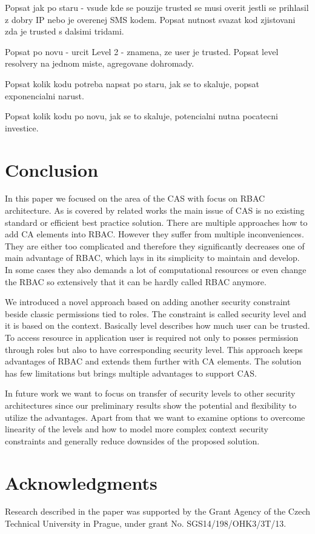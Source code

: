 \documentclass{sig-alternate}
\begin{document}
Popsat jak po staru - vsude kde se pouzije trusted se musi overit jestli se prihlasil z dobry IP nebo je overenej SMS kodem. Popsat nutnost svazat kod zjistovani zda je trusted s dalsimi tridami.

Popsat po novu - urcit Level 2 - znamena, ze user je trusted. Popsat level resolvery na jednom miste, agregovane dohromady.

Popsat kolik kodu potreba napsat po staru, jak se to skaluje, popsat exponencialni narust.

Popsat kolik kodu po novu, jak se to skaluje, potencialni nutna pocatecni investice.

\section{Conclusion}
In this paper we focused on the area of the CAS with focus on RBAC architecture. As is covered by related works the main issue of CAS is no existing standard or efficient best practice solution. There are multiple approaches how to add CA elements into RBAC. However they suffer from multiple inconveniences. They are either too complicated and therefore they significantly decreases one of main advantage of RBAC, which lays in its simplicity to maintain and develop. In some cases they also demands a lot of computational resources or even change the RBAC so extensively that it can be hardly called RBAC anymore.

We introduced a novel approach based on adding another security constraint beside classic permissions tied to roles. The constraint is called security level and it is based on the context. Basically level describes how much user can be trusted. To access resource in application user is required not only to posses permission through roles but also to have corresponding security level. This approach keeps advantages of RBAC and extends them further with CA elements. The solution has few limitations but brings multiple advantages to support CAS. 

In future work we want to focus on transfer of security levels to other security architectures since our preliminary results show the potential and flexibility to utilize the advantages. Apart from that we want to examine options to overcome linearity of the levels and how to model more complex context security constraints and generally reduce downsides of the proposed solution.

\section{Acknowledgments}
Research described in the paper was supported by the
Grant Agency of the Czech Technical University in Prague, under grant No. SGS14/198/OHK3/3T/13.

%

%
%
\end{document}
